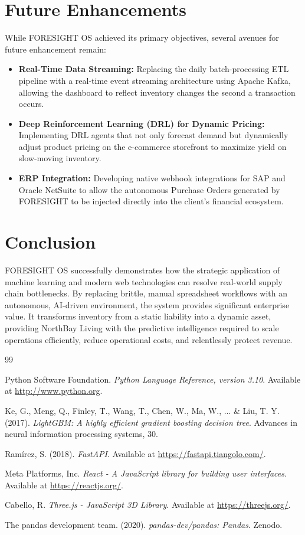 \documentclass[12pt,a4paper]{report}
\begin{document}
\section{Future Enhancements}
While FORESIGHT OS achieved its primary objectives, several avenues for future enhancement remain:
\begin{itemize}
    \item \textbf{Real-Time Data Streaming:} Replacing the daily batch-processing ETL pipeline with a real-time event streaming architecture using Apache Kafka, allowing the dashboard to reflect inventory changes the second a transaction occurs.
    \item \textbf{Deep Reinforcement Learning (DRL) for Dynamic Pricing:} Implementing DRL agents that not only forecast demand but dynamically adjust product pricing on the e-commerce storefront to maximize yield on slow-moving inventory.
    \item \textbf{ERP Integration:} Developing native webhook integrations for SAP and Oracle NetSuite to allow the autonomous Purchase Orders generated by FORESIGHT to be injected directly into the client's financial ecosystem.
\end{itemize}

\section{Conclusion}
FORESIGHT OS successfully demonstrates how the strategic application of machine learning and modern web technologies can resolve real-world supply chain bottlenecks. By replacing brittle, manual spreadsheet workflows with an autonomous, AI-driven environment, the system provides significant enterprise value. It transforms inventory from a static liability into a dynamic asset, providing NorthBay Living with the predictive intelligence required to scale operations efficiently, reduce operational costs, and relentlessly protect revenue.

\renewcommand{\bibname}{References}
\begin{thebibliography}{99}

Python Software Foundation. \textit{Python Language Reference, version 3.10}. Available at \url{http://www.python.org}.

Ke, G., Meng, Q., Finley, T., Wang, T., Chen, W., Ma, W., ... \& Liu, T. Y. (2017). \textit{LightGBM: A highly efficient gradient boosting decision tree}. Advances in neural information processing systems, 30.

Ramírez, S. (2018). \textit{FastAPI}. Available at \url{https://fastapi.tiangolo.com/}.

Meta Platforms, Inc. \textit{React - A JavaScript library for building user interfaces}. Available at \url{https://reactjs.org/}.

Cabello, R. \textit{Three.js - JavaScript 3D Library}. Available at \url{https://threejs.org/}.

The pandas development team. (2020). \textit{pandas-dev/pandas: Pandas}. Zenodo.

\end{thebibliography}
\end{document}
